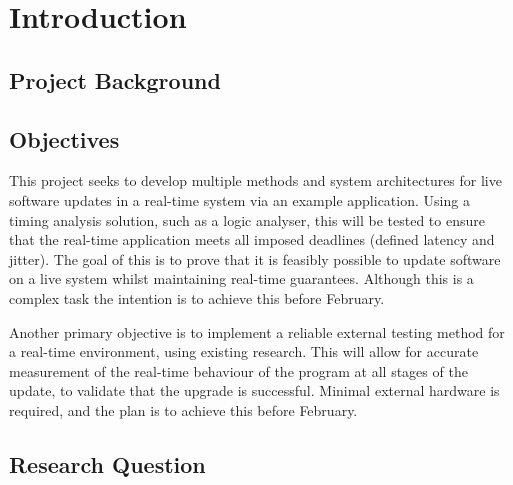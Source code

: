 \chapter{Introduction}


\section{Project Background}


\section{Objectives}


This project seeks to develop multiple methods and system architectures for live software updates in a real-time system via an example application. Using a timing analysis solution, such as a logic analyser, this will be tested to ensure that the real-time application meets all imposed deadlines (defined latency and jitter). The goal of this is to prove that it is feasibly possible to update software on a live system whilst maintaining real-time guarantees. Although this is a complex task the intention is to achieve this before February.

Another primary objective is to implement a reliable external testing method for a real-time environment, using existing research. This will allow for accurate measurement of the real-time behaviour of the program at all stages of the update, to validate that the upgrade is successful. Minimal external hardware is required, and the plan is to achieve this before February.


\section{Research Question}

